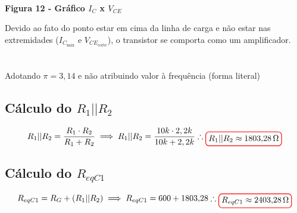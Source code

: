 \documentclass[12pt,openany,oneside,a4paper]{abntex2}
\begin{document}
\begin{center}

    \\  %

    \large \textbf{Figura 12 - Gráfico $I_C$ x $V_{CE}$}
\end{center} Devido ao fato do ponto estar em cima da linha de carga e não estar nas extremidades ($I_{C_{\text{máx}}}$ e $V_{CE_{\text{corte}}}$), o transistor se comporta como um amplificador.

\section{}
Adotando $\pi = 3,14$ e não atribuindo valor à frequência (forma literal)

\subsection{Cálculo do $R_{1} || R_{2}$}
\[
R_{1} || R_{2} = \frac{R_{1} \cdot R_{2}}{R_{1} + R_{2}} \implies R_{1} || R_{2} = \frac{10k \cdot 2,2k}{10k + 2,2k} \therefore \tikz[baseline]{\node[draw=red, thick, rounded corners] {$R_{1} || R_{2} \approx 1803{,}28\,\Omega$};}
\]

\subsection{Cálculo do $R_{eqC1}$}
\[
R_{eqC1} = R_{G} + (R_{1} || R_{2}) \implies R_{eqC1} = 600 + 1803{,}28 \therefore \tikz[baseline]{\node[draw=red, thick, rounded corners] {$R_{eqC1} \approx 2403{,}28\,\Omega$};}
\]
\end{document}
